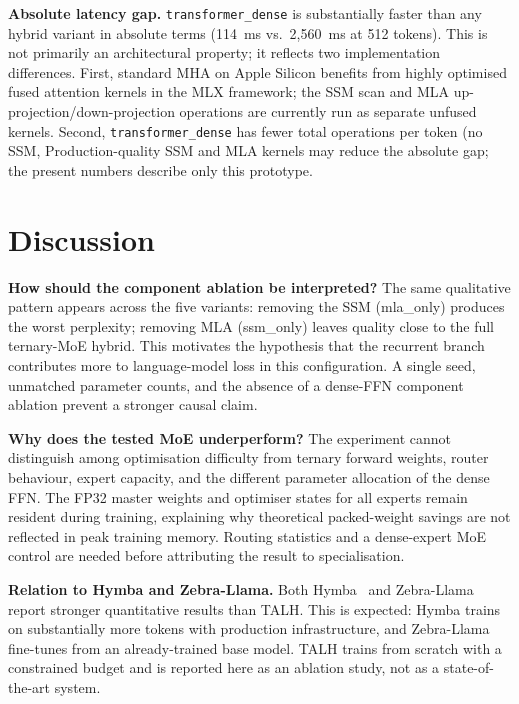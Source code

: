 \documentclass[conference]{IEEEtran}
\begin{document}
\textbf{Absolute latency gap.} \texttt{transformer\_dense} is
substantially faster than any hybrid variant in absolute terms (114~ms
vs.\ 2{,}560~ms at 512 tokens). This is not primarily an architectural
property; it reflects two implementation differences. First, standard MHA
on Apple Silicon benefits from highly optimised fused attention kernels in
the MLX framework; the SSM scan and MLA up-projection/down-projection
operations are currently run as separate unfused kernels. Second,
\texttt{transformer\_dense} has fewer total operations per token (no SSM,
Production-quality SSM and MLA kernels may reduce the absolute gap; the present
numbers describe only this prototype.


\section{Discussion}

\textbf{How should the component ablation be interpreted?} The same qualitative
pattern appears across the five variants:
removing the SSM (mla\_only) produces the worst perplexity; removing MLA
(ssm\_only) leaves quality close to the full ternary-MoE hybrid. This motivates
the hypothesis that the recurrent branch contributes more to language-model
loss in this configuration. A single seed, unmatched parameter counts, and the
absence of a dense-FFN component ablation prevent a stronger causal claim.

\textbf{Why does the tested MoE underperform?} The experiment cannot distinguish
among optimisation difficulty from ternary forward weights, router behaviour,
expert capacity, and the different parameter allocation of the dense FFN. The
FP32 master weights and optimiser states for all experts remain resident during
training, explaining why theoretical packed-weight savings are not reflected
in peak training memory. Routing statistics and a dense-expert MoE control are
needed before attributing the result to specialisation.

\textbf{Relation to Hymba and Zebra-Llama.} Both Hymba~\cite{hymba2024} and
Zebra-Llama~\cite{zebra2025} report stronger quantitative results than TALH.
This is expected: Hymba trains on substantially more tokens with production
infrastructure, and Zebra-Llama fine-tunes from an already-trained base model.
TALH trains from scratch with a constrained budget and is reported here as an
ablation study, not as a state-of-the-art system.
\end{document}
